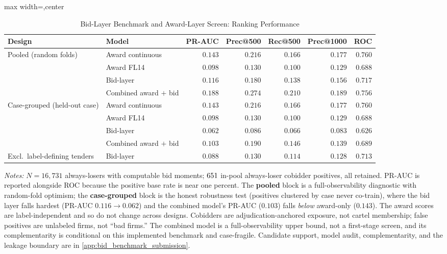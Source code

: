 \begin{table}[htbp]
\centering
\caption{Bid-Layer Benchmark and Award-Layer Screen: Ranking Performance}
\label{tab:bid_layer_performance}
\begin{adjustbox}{max width=\textwidth,center}
\begin{threeparttable}
\scriptsize
\begin{tabular}{llrrrrr}
\toprule
Design & Model & PR-AUC & Prec@500 & Rec@500 & Prec@1000 & ROC \\
\midrule
\multirow{4}{*}{Pooled (random folds)}
 & Award continuous & $0.143$ & $0.216$ & $0.166$ & $0.177$ & $0.760$ \\
 & Award FL14 & $0.098$ & $0.130$ & $0.100$ & $0.129$ & $0.688$ \\
 & Bid-layer \valBidLearner{} & $0.116$ & $0.180$ & $0.138$ & $0.156$ & $0.717$ \\
 & Combined award $+$ bid & $0.188$ & $0.274$ & $0.210$ & $0.189$ & $0.756$ \\
\midrule
\multirow{4}{*}{Case-grouped (held-out case)}
 & Award continuous & $0.143$ & $0.216$ & $0.166$ & $0.177$ & $0.760$ \\
 & Award FL14 & $0.098$ & $0.130$ & $0.100$ & $0.129$ & $0.688$ \\
 & Bid-layer \valBidLearner{} & $0.062$ & $0.086$ & $0.066$ & $0.083$ & $0.626$ \\
 & Combined award $+$ bid & $0.103$ & $0.190$ & $0.146$ & $0.139$ & $0.689$ \\
\midrule
Excl.\ label-defining tenders & Bid-layer \valBidLearner{} & $0.088$ & $0.130$ & $0.114$ & $0.128$ & $0.713$ \\
\bottomrule
\end{tabular}
\begin{tablenotes}
\scriptsize
\item \textit{Notes:} $N=16{,}731$ always-losers with computable
bid moments; $651$ in-pool always-loser cobidder
positives, all retained. PR-AUC is reported alongside ROC because
the positive base rate is near one percent. The
\textbf{pooled} block is a full-observability diagnostic with
random-fold optimism; the \textbf{case-grouped} block is the
honest robustness test (positives clustered by case never
co-train), where the bid layer falls hardest (PR-AUC
$0.116\!\to\!0.062$) and the combined model's PR-AUC ($0.103$)
falls \emph{below} award-only ($0.143$). The award scores are
label-independent and so do not change across designs. Cobidders
are adjudication-anchored exposure, not cartel membership; false
positives are unlabeled firms, not ``bad firms.'' The combined
model is a full-observability upper bound, not a first-stage
screen, and its complementarity is conditional on this implemented
benchmark and case-fragile. Candidate support, model audit,
complementarity, and the leakage boundary are in
\ref{app:bid_benchmark_submission}.
\end{tablenotes}
\end{threeparttable}
\end{adjustbox}
\end{table}

